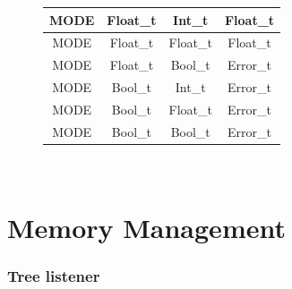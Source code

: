 \begin{figure}[H]
\begin{tabular}{cccc}
        \midrule MODE & Float\_t & Int\_t    & Float\_t \\
        \midrule MODE & Float\_t & Float\_t  & Float\_t \\
        \midrule MODE & Float\_t & Bool\_t   & Error\_t \\

        \midrule MODE & Bool\_t & Int\_t     & Error\_t \\
        \midrule MODE & Bool\_t & Float\_t   & Error\_t \\
        \midrule MODE & Bool\_t & Bool\_t    & Error\_t \\

        \bottomrule
    \end{tabular}\\
\end{figure}

\newpage

\section{Memory Management}

\subsubsection{Tree listener}

